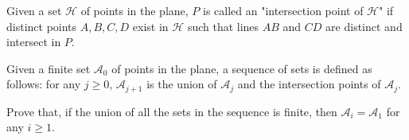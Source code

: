 Given a set $ \mathcal{H}$ of points in the plane, $ P$ is called an "intersection point of $ \mathcal{H}$" if distinct points $ A,B,C,D$ exist in $ \mathcal{H}$ such that lines $ AB$ and $ CD$ are distinct and intersect in $ P$.

Given a finite set $ \mathcal{A}_{0}$ of points in the plane, a sequence of sets is defined as follows: for any $ j\geq0$,  $ \mathcal{A}_{j+1}$ is the union of $ \mathcal{A}_{j}$ and the intersection points of $ \mathcal{A}_{j}$.

Prove that, if the union of all the sets in the sequence is finite, then $ \mathcal{A}_{i}=\mathcal{A}_{1}$ for any $ i\geq1$.